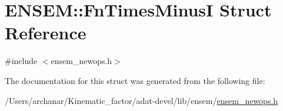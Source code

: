 \hypertarget{structENSEM_1_1FnTimesMinusI}{}\section{E\+N\+S\+EM\+:\+:Fn\+Times\+MinusI Struct Reference}
\label{structENSEM_1_1FnTimesMinusI}


{\ttfamily \#include $<$ensem\+\_\+newops.\+h$>$}



The documentation for this struct was generated from the following file\+:\begin{DoxyCompactItemize}
\item 
/\+Users/archanar/\+Kinematic\+\_\+factor/adat-\/devel/lib/ensem/\mbox{\hyperlink{adat-devel_2lib_2ensem_2ensem__newops_8h}{ensem\+\_\+newops.\+h}}\end{DoxyCompactItemize}
